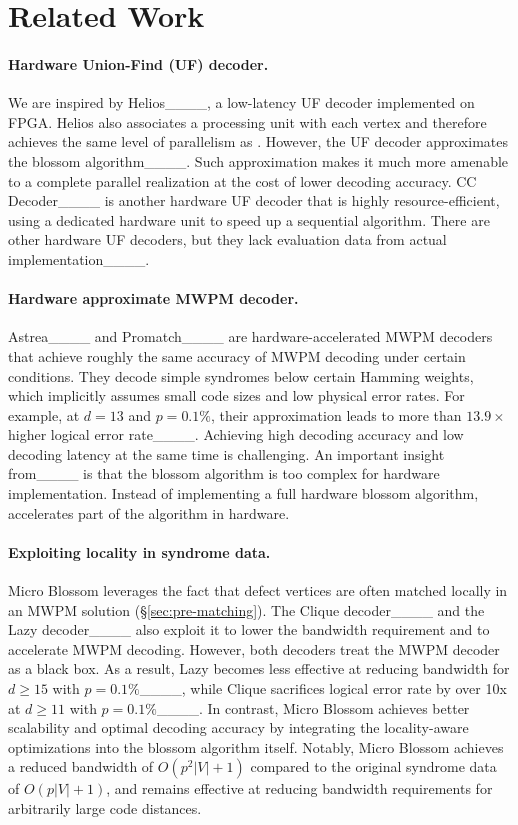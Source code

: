 \section{Related Work}
\label{sec:related}

\paragraph{Hardware Union-Find (UF) decoder.} 
We are inspired by Helios____, a low-latency UF decoder implemented on FPGA.
Helios also associates a processing unit with each vertex and therefore achieves the same level of parallelism as \arch.
However, the UF decoder approximates the blossom algorithm____.
Such approximation makes it much more amenable to a complete parallel realization at the cost of lower decoding accuracy. 
CC Decoder____ is another hardware UF decoder that is highly resource-efficient, using a dedicated hardware unit to speed up a sequential algorithm.
There are other hardware UF decoders, but they lack evaluation data from actual implementation____.

\paragraph{Hardware approximate MWPM decoder.}
Astrea____ and Promatch____ are hardware-accelerated MWPM decoders that achieve roughly the same accuracy of MWPM decoding under certain conditions.
They decode simple syndromes below certain Hamming weights, which implicitly assumes small code sizes and low physical error rates.
For example, at $d=13$ and $p=0.1\%$, their approximation leads to more than $13.9\times$ higher logical error rate____.
Achieving high decoding accuracy and low decoding latency at the same time is challenging.
An important insight from____ is that the blossom algorithm is too complex for hardware implementation.
Instead of implementing a full hardware blossom algorithm, \system accelerates part of the algorithm in hardware.


\paragraph{Exploiting locality in syndrome data.} Micro Blossom leverages the fact that defect vertices are often matched locally in an MWPM solution (\S\ref{sec:pre-matching}).
The Clique decoder____ and the Lazy decoder____ also exploit it to lower the bandwidth requirement and to accelerate MWPM decoding.
However, both decoders treat the MWPM decoder as a black box. As a result, Lazy becomes less effective at reducing bandwidth for $d \ge 15$ with $p=0.1\%$____, 
while Clique sacrifices logical error rate by over 10x at $d \ge 11$ with $p=0.1\%$____.
In contrast, Micro Blossom achieves better scalability and optimal decoding accuracy by integrating the locality-aware optimizations into the blossom algorithm itself.
Notably, Micro Blossom achieves a reduced bandwidth of $O(p^2 |V| + 1)$ compared to the original syndrome data of $O(p|V| + 1)$, and remains effective at reducing bandwidth requirements for arbitrarily large code distances.

